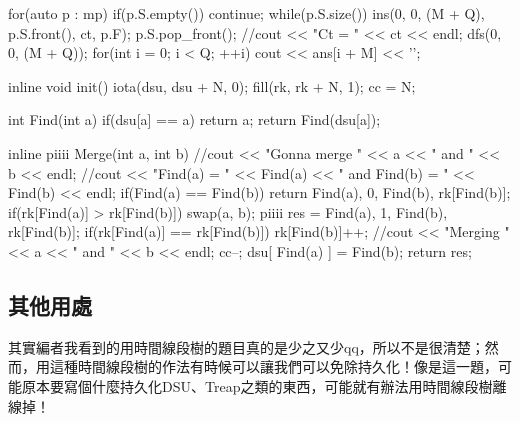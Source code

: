 \documentclass[main.tex]{subfiles}
\begin{document}
\begin{C++}
{{        for(auto p : mp){
            if(p.S.empty()) continue;
            while(p.S.size()){
                ins(0, 0, (M + Q), p.S.front(), ct, p.F);
                p.S.pop_front();
            }
        }
        //cout << "Ct = " << ct << endl;
        dfs(0, 0, (M + Q));
        for(int i = 0; i < Q; ++i){
            cout << ans[i + M] << '\n';
        }
    }
}

inline void init(){
    iota(dsu, dsu + N, 0);
    fill(rk, rk + N, 1);
    cc = N;
}

int Find(int a){
    if(dsu[a] == a) return a;
    return Find(dsu[a]);
}

inline piiii Merge(int a, int b){
    //cout << "Gonna merge " << a << " and " << b << endl;
    //cout << "Find(a) = " << Find(a) << " and Find(b) = " << Find(b) << endl;
    if(Find(a) == Find(b)) return {{Find(a), 0}, {Find(b), rk[Find(b)]}};
    if(rk[Find(a)] > rk[Find(b)]) swap(a, b);
    piiii res = {{Find(a), 1}, {Find(b), rk[Find(b)]}};
    if(rk[Find(a)] == rk[Find(b)]) rk[Find(b)]++;
    //cout << "Merging " << a << " and " << b << endl;
    cc--;
    dsu[ Find(a) ] = Find(b);
    return res;
}
\end{C++}

\subsection{其他用處}
	其實編者我看到的用時間線段樹的題目真的是少之又少qq，所以不是很清楚；然而，用這種時間線段樹的作法有時候可以讓我們可以免除持久化！像是這一題，可能原本要寫個什麼持久化DSU、Treap之類的東西，可能就有辦法用時間線段樹離線掉！

	
\end{document}
